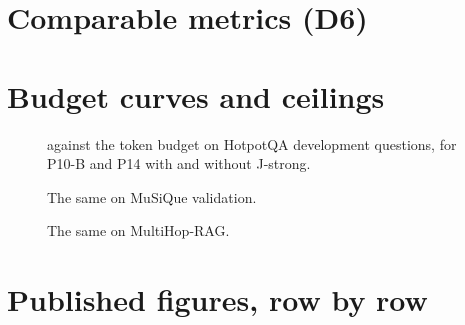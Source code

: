 \begin{table}[t]
\centering
\scriptsize
\caption{\capDFiveMultihopRag}

\end{table}

\section{Comparable metrics (D6)}
\label{app:d6}

\begin{table}[t]
\centering
\scriptsize
\caption{\capDSixHotpotqa}
\end{table}

\begin{table}[t]
\centering
\scriptsize
\caption{\capDSixMusique}
\end{table}

\begin{table}[t]
\centering
\scriptsize
\caption{\capDSixMultihopRag}
\end{table}

\section{Budget curves and ceilings}
\label{app:more}

\begin{table}[t]
\centering
\scriptsize
\caption{\capBudgetCurve}
\end{table}

\begin{figure}[t]
\centering

\caption{\FS{} against the token budget on HotpotQA development questions, for P10-B and P14
with and without J-strong.}
\end{figure}

\begin{figure}[t]
\centering

\caption{The same on MuSiQue validation.}
\end{figure}

\begin{figure}[t]
\centering

\caption{The same on MultiHop-RAG.}
\end{figure}

\begin{table}[t]
\centering
\scriptsize
\caption{\capCeiling}
\end{table}

\clearpage
\onecolumn
\section{Published figures, row by row}
\label{app:pub}

\begingroup
\scriptsize
\setlength{\tabcolsep}{3pt}



\endgroup
